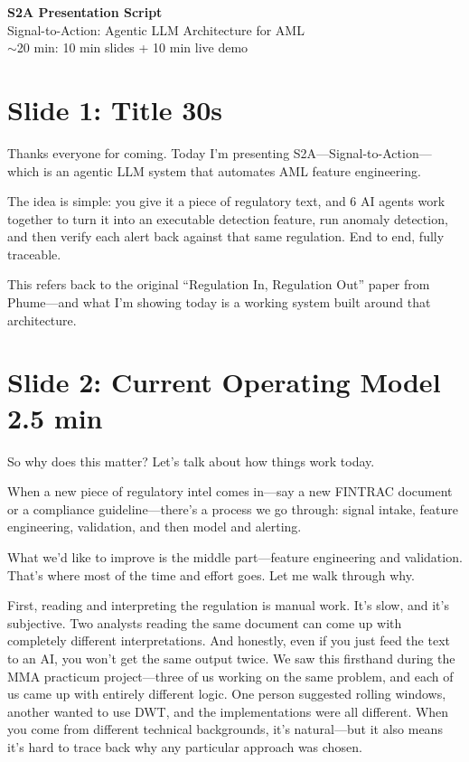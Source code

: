 \documentclass[11pt, a4paper]{article}
\newcommand{\timing}[1]{{\hfill\small\color{gray}#1}}
\begin{document}
\begin{center}
  {\LARGE\bfseries S2A Presentation Script}\\[0.3em]
  {\large Signal-to-Action: Agentic LLM Architecture for AML}\\[0.3em]
  {\color{gray} $\sim$20 min: 10 min slides + 10 min live demo}
\end{center}

\vspace{1em}

\section{Slide 1: Title \timing{30s}}

Thanks everyone for coming. Today I'm presenting S2A---Signal-to-Action---which is an agentic LLM system that automates AML feature engineering.

The idea is simple: you give it a piece of regulatory text, and 6 AI agents work together to turn it into an executable detection feature, run anomaly detection, and then verify each alert back against that same regulation. End to end, fully traceable.

This refers back to the original ``Regulation In, Regulation Out'' paper from Phume---and what I'm showing today is a working system built around that architecture.

\section{Slide 2: Current Operating Model \timing{2.5 min}}

So why does this matter? Let's talk about how things work today.

When a new piece of regulatory intel comes in---say a new FINTRAC document or a compliance guideline---there's a process we go through: signal intake, feature engineering, validation, and then model and alerting.

What we'd like to improve is the middle part---feature engineering and validation. That's where most of the time and effort goes. Let me walk through why.

First, reading and interpreting the regulation is manual work. It's slow, and it's subjective. Two analysts reading the same document can come up with completely different interpretations. And honestly, even if you just feed the text to an AI, you won't get the same output twice. We saw this firsthand during the MMA practicum project---three of us working on the same problem, and each of us came up with entirely different logic. One person suggested rolling windows, another wanted to use DWT, and the implementations were all different. When you come from different technical backgrounds, it's natural---but it also means it's hard to trace back why any particular approach was chosen.
\end{document}
